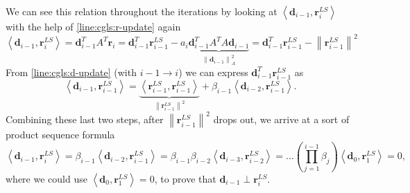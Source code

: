 \documentclass{article}
\begin{document}
	We can see this relation throughout the iterations by looking at $\left\langle \textbf{d}_{i-1}, \textbf{r}_i^{LS}\right\rangle$ with the help of \autoref{line:cgls:r-update} again
	\begin{equation}
		\left\langle \textbf{d}_{i-1}, \textbf{r}_i^{LS}\right\rangle = \textbf{d}_{i-1}^T A^T  \textbf{r}_i 
		= \textbf{d}_{i-1}^T  \textbf{r}_{i-1}^{LS} - a_i\underbrace{\textbf{d}_{i-1}^T A^T A \textbf{d}_{i-1}}_{\left\| \textbf{d}_{i-1} \right\|^2_A} 
		=\textbf{d}_{i-1}^T  \textbf{r}_{i-1}^{LS}  - \left\| \textbf{r}_{i-1}^{LS}\right\|^2
	\end{equation}
	From \autoref{line:cgls:d-update} (with $i-1\to i$) we can express $\textbf{d}_{i-1}^T  \textbf{r}_{i-1}^{LS}$ as
	\begin{equation}
		\left\langle \textbf{d}_{i-1},  \textbf{r}_{i-1}^{LS}\right\rangle = \underbrace{\left\langle \textbf{r}_{i-1}^{LS},  \textbf{r}_{i-1}^{LS}\right\rangle}_{\left\| \textbf{r}_{i-1}^{LS}\right\|^2} + \beta_{i-1}\left\langle \textbf{d}_{i-2}, \textbf{r}_{i-1}^{LS}\right\rangle.
	\end{equation}
	Combining these last two steps, after $\left\| \textbf{r}_{i-1}^{LS}\right\|^2$ drops out, we arrive at a sort of product sequence formula
	\begin{equation}
		\left\langle \textbf{d}_{i-1}, \textbf{r}_i^{LS}\right\rangle = \beta_{i-1}\left\langle \textbf{d}_{i-2}, \textbf{r}_{i-1}^{LS}\right\rangle = \beta_{i-1}\beta_{i-2}\left\langle \textbf{d}_{i-3}, \textbf{r}_{i-2}^{LS}\right\rangle = \dots \left(\prod_{j=1}^{i-1}\beta_j\right) \left\langle \textbf{d}_{0}, \textbf{r}_{1}^{LS}\right\rangle = 0,
	\end{equation}
	where we could use $\left\langle \textbf{d}_0, \textbf{r}_1^{LS}\right\rangle = 0$, to prove that $\textbf{d}_{i-1} \perp \textbf{r}_i^{LS}$. %
	
	
	
	
	
\end{document}

